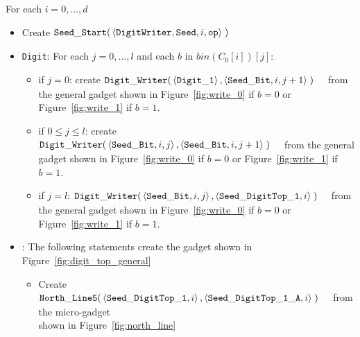     For each $i=0,\ldots,d$

    \begin{itemize}
        \item Create
        $\begin{aligned}[t]
            {\tt Seed\_Start}(&\left\langle {\tt DigitWriter}, {\tt Seed}, i, {\tt op} \right\rangle \; )
        \end{aligned}$

        \item {\tt Digit}: For each $j=0,\ldots,l$ and each $b$ in $bin(C_0[i])[j]$:
        \begin{itemize}
            \item if $j = 0$: create
            $\begin{aligned}[t]
                {\tt Digit\_Writer}(&\left\langle {\tt Digit\_1} \right\rangle, \left\langle {\tt Seed\_Bit}, i, j + 1 \right\rangle \;)
            \end{aligned}$ from the general gadget shown in Figure~\ref{fig:write_0} if $b = 0$ or Figure~\ref{fig:write_1} if $b = 1$.

            \item if $0 \leqslant j \leqslant l$: create
            $\begin{aligned}[t]
                {\tt Digit\_Writer}(&\left\langle {\tt Seed\_Bit}, i, j \right\rangle, \left\langle {\tt Seed\_Bit}, i, j + 1 \right\rangle \;)
            \end{aligned}$ from the general gadget shown in Figure~\ref{fig:write_0} if $b = 0$ or Figure~\ref{fig:write_1} if $b = 1$.

            \item if $j = l$:
            $\begin{aligned}[t]
                {\tt Digit\_Writer}(&\left\langle {\tt Seed\_Bit}, i, j \right\rangle, \left\langle {\tt Seed\_DigitTop\_1}, i \right\rangle \;)
            \end{aligned}$ from the general gadget shown in Figure~\ref{fig:write_0} if $b = 0$ or Figure~\ref{fig:write_1} if $b = 1$.

        \end{itemize}

        \item {\dtop}: The following statements create the gadget shown in Figure~\ref{fig:digit_top_general}
        \begin{itemize}
            \item Create
            $\begin{aligned}[t]
                {\tt North\_Line5}(& \left \langle {\tt Seed\_DigitTop\_1},    i \right\rangle,
                                     \left \langle {\tt Seed\_DigitTop\_1\_A}, i \right\rangle \;)
            \end{aligned}$ from the micro-gadget\\shown in Figure~\ref{fig:north_line}


\end{itemize}
\end{itemize}
